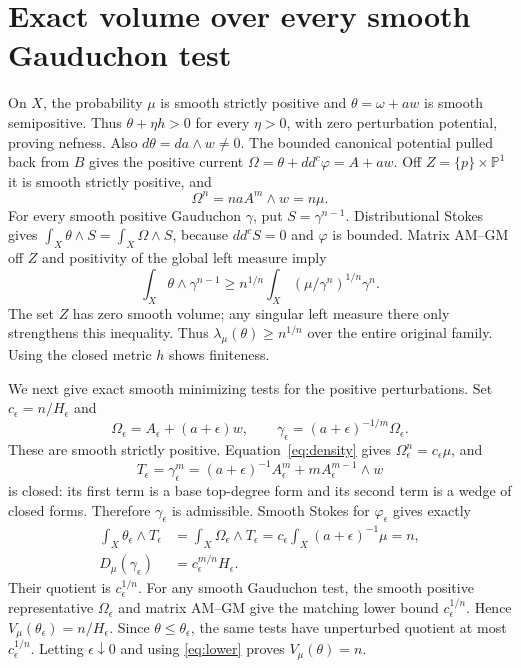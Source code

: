 \documentclass[11pt]{article}
\newcommand{\ddc}{dd^c}
\theoremstyle{remark}\newtheorem{remark}[theorem]{Remark}
\begin{document}
\section{Exact volume over every smooth Gauduchon test}
On $X$, the probability $\mu$ is smooth strictly positive and
$\theta=\omega+a w$ is smooth semipositive. Thus $\theta+\eta h>0$
for every $\eta>0$, with zero perturbation potential, proving nefness.
Also $d\theta=da\wedge w\ne0$.
The bounded canonical potential pulled back from $B$ gives the positive
current $\Omega=\theta+\ddc\varphi=A+a w$. Off
$Z=\{p\}\times\mathbb P^1$ it is smooth strictly positive, and
\[
 \Omega^n=n a A^m\wedge w=n\mu.
\]
For every smooth positive Gauduchon $\gamma$, put $S=\gamma^{n-1}$.
Distributional Stokes gives $\int_X\theta\wedge S=\int_X\Omega\wedge S$,
because $\ddc S=0$ and $\varphi$ is bounded.
Matrix AM--GM off $Z$ and positivity of the global left measure imply
\begin{equation}\label{eq:lower}
 \int_X\theta\wedge\gamma^{n-1}\geq
 n^{1/n}\int_X(\mu/\gamma^n)^{1/n}\gamma^n.
\end{equation}
The set $Z$ has zero smooth volume; any singular left measure there only
strengthens this inequality. Thus $\lambda_\mu(\theta)\geq n^{1/n}$
over the entire original family. Using the closed metric $h$ shows finiteness.

We next give exact smooth minimizing tests for the positive perturbations.
Set $c_\epsilon=n/H_\epsilon$ and
\[
 \Omega_\epsilon=A_\epsilon+(a+\epsilon)w,
 \qquad\gamma_\epsilon=(a+\epsilon)^{-1/m}\Omega_\epsilon.
\]
These are smooth strictly positive. Equation~\eqref{eq:density} gives
$\Omega_\epsilon^n=c_\epsilon\mu$, and
\[
 T_\epsilon=\gamma_\epsilon^m
 =(a+\epsilon)^{-1}A_\epsilon^m
       +m A_\epsilon^{m-1}\wedge w
\]
is closed: its first term is a base top-degree form and its second term is
a wedge of closed forms. Therefore $\gamma_\epsilon$ is admissible.
Smooth Stokes for $\varphi_\epsilon$ gives exactly
\begin{align*}
 \int_X\theta_\epsilon\wedge T_\epsilon
 &=\int_X\Omega_\epsilon\wedge T_\epsilon
 =c_\epsilon\int_X(a+\epsilon)^{-1}\mu=n,\\
 D_\mu(\gamma_\epsilon)&=c_\epsilon^{m/n}H_\epsilon.
\end{align*}
Their quotient is $c_\epsilon^{1/n}$. For any smooth Gauduchon test,
the smooth positive representative $\Omega_\epsilon$ and matrix AM--GM
give the matching lower bound $c_\epsilon^{1/n}$. Hence
$V_\mu(\theta_\epsilon)=n/H_\epsilon$.
Since $\theta\leq\theta_\epsilon$, the same tests have unperturbed
quotient at most $c_\epsilon^{1/n}$. Letting $\epsilon\downarrow0$
and using \eqref{eq:lower} proves $V_\mu(\theta)=n$.
\end{document}
